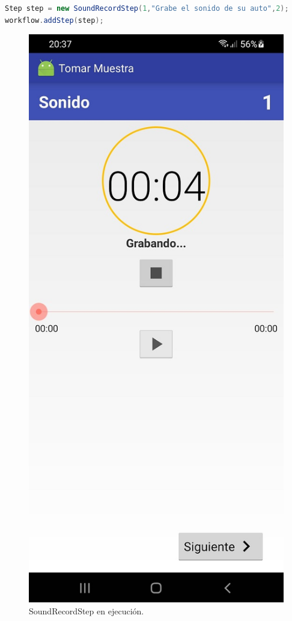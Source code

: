 \begin{lstlisting}[language=Java, frame=tlbr, caption=SoundRecordStep en Java.]	
Step step = new SoundRecordStep(1,"Grabe el sonido de su auto",2); 
workflow.addStep(step);
\end{lstlisting}


\begin{figure}[H]
  \centering
    \includegraphics[scale=0.3]{50-anexos/C-steps/sound_screen.jpg} 
    \caption{SoundRecordStep en ejecución.}
\end{figure}



